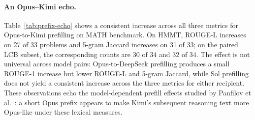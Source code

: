 \paragraph{An Opus--Kimi echo.}
Table~\ref{tab:prefix-echo} shows a consistent increase across all three metrics for Opus-to-Kimi prefilling on MATH benchmark.
On HMMT, ROUGE-L increases on 27 of 33 problems and 5-gram Jaccard increases on 31 of 33; on the paired LCB subset, the corresponding counts are 30 of 34 and 32 of 34.
The effect is not universal across model pairs: Opus-to-DeepSeek prefilling produces a small ROUGE-1 increase but lower ROUGE-L and 5-gram Jaccard, while Sol prefilling does not yield a consistent increase across the three metrics for either recipient.
These observations echo the model-dependent prefill effects studied by Panfilov et al.~\citep{panfilov2026stealing}: a short Opus prefix appears to make Kimi's subsequent reasoning text more Opus-like under these lexical measures.

